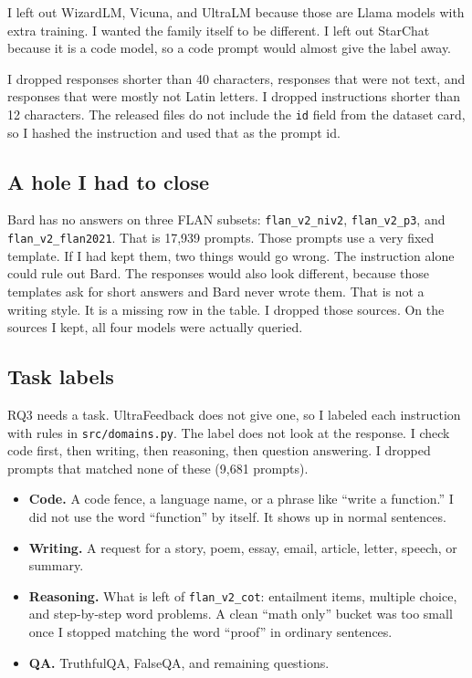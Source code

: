 \documentclass[11pt]{article}
\begin{document}
I left out WizardLM, Vicuna, and UltraLM because those are Llama models with extra training. I wanted the family itself to be different. I left out StarChat because it is a code model, so a code prompt would almost give the label away.

I dropped responses shorter than 40 characters, responses that were not text, and responses that were mostly not Latin letters. I dropped instructions shorter than 12 characters. The released files do not include the \texttt{id} field from the dataset card, so I hashed the instruction and used that as the prompt id.

\subsection{A hole I had to close}

Bard has no answers on three FLAN subsets: \texttt{flan\_v2\_niv2}, \texttt{flan\_v2\_p3}, and \texttt{flan\_v2\_flan2021}. That is 17,939 prompts. Those prompts use a very fixed template. If I had kept them, two things would go wrong. The instruction alone could rule out Bard. The responses would also look different, because those templates ask for short answers and Bard never wrote them. That is not a writing style. It is a missing row in the table. I dropped those sources. On the sources I kept, all four models were actually queried.

\subsection{Task labels}

RQ3 needs a task. UltraFeedback does not give one, so I labeled each instruction with rules in \texttt{src/domains.py}. The label does not look at the response. I check code first, then writing, then reasoning, then question answering. I dropped prompts that matched none of these (9,681 prompts).

\begin{itemize}
\item \textbf{Code.} A code fence, a language name, or a phrase like ``write a function.'' I did not use the word ``function'' by itself. It shows up in normal sentences.
\item \textbf{Writing.} A request for a story, poem, essay, email, article, letter, speech, or summary.
\item \textbf{Reasoning.} What is left of \texttt{flan\_v2\_cot}: entailment items, multiple choice, and step-by-step word problems. A clean ``math only'' bucket was too small once I stopped matching the word ``proof'' in ordinary sentences.
\item \textbf{QA.} TruthfulQA, FalseQA, and remaining questions.
\end{itemize}
\end{document}
